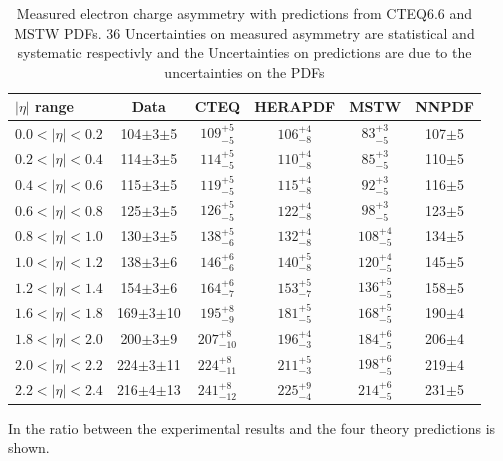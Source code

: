 \begin{table}[htbp]
\begin{center}
\begin{tabular}{lccccc}
$|\eta|$ range  & Data & CTEQ & HERAPDF & MSTW & NNPDF \\ \hline
  $0.0<|\eta|<0.2$ &104$\pm$3$\pm$5 &$109^{+5}_{-5}$ &$106^{+4}_{-8}$ & $83^{+3}_{-5}$& 107$\pm$5\\
  $0.2<|\eta|<0.4$ &114$\pm$3$\pm$5 &$114^{+5}_{-5}$ &$110^{+4}_{-8}$ & $85^{+3}_{-5}$& 110$\pm$5\\
  $0.4<|\eta|<0.6$ &115$\pm$3$\pm$5 &$119^{+5}_{-5}$ &$115^{+4}_{-8}$ & $92^{+3}_{-5}$& 116$\pm$5\\
  $0.6<|\eta|<0.8$ &125$\pm$3$\pm$5 &$126^{+5}_{-5}$ &$122^{+4}_{-8}$ & $98^{+3}_{-5}$& 123$\pm$5\\
  $0.8<|\eta|<1.0$ &130$\pm$3$\pm$5 &$138^{+5}_{-6}$ &$132^{+4}_{-8}$ & $108^{+4}_{-5}$& 134$\pm$5\\
  $1.0<|\eta|<1.2$ &138$\pm$3$\pm$6 &$146^{+6}_{-6}$ &$140^{+5}_{-8}$ & $120^{+4}_{-5}$&145$\pm$5 \\
  $1.2<|\eta|<1.4$ &154$\pm$3$\pm$6 &$164^{+6}_{-7}$ &$153^{+5}_{-7}$ & $136^{+5}_{-5}$&158$\pm$5 \\
  $1.6<|\eta|<1.8$ &169$\pm$3$\pm$10 &$195^{+8}_{-9}$ &$181^{+5}_{-5}$ & $168^{+5}_{-5}$&190$\pm$4 \\
  $1.8<|\eta|<2.0$ &200$\pm$3$\pm$9 &$207^{+8}_{-10}$ &$196^{+4}_{-3}$ & $184^{+6}_{-5}$&206$\pm$4 \\
  $2.0<|\eta|<2.2$ &224$\pm$3$\pm$11 &$224^{+8}_{-11}$ &$211^{+5}_{-3}$ & $198^{+6}_{-5}$&219$\pm$4 \\
  $2.2<|\eta|<2.4$ &216$\pm$4$\pm$13 &$241^{+8}_{-12}$ &$225^{+9}_{-4}$ & $214^{+6}_{-5}$&231$\pm$5 \\
\end{tabular}
\caption{Measured electron charge asymmetry with predictions from CTEQ6.6 and MSTW PDFs.  36 Uncertainties on measured asymmetry are statistical and systematic respectivly and the Uncertainties on predictions are due to the uncertainties on the PDFs}
\label{tab:results}
\end{center}
\end{table}


In  the ratio between the experimental results and the four theory predictions is shown.


